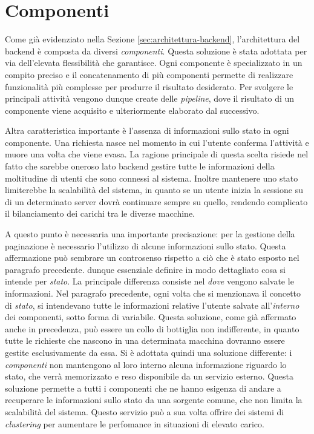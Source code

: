 \section{Componenti\label{sec:componenti-backend}}

Come già evidenziato nella Sezione \ref{sec:architettura-backend}, l'architettura del backend è composta da diversi \emph{componenti}. Questa soluzione è stata adottata per via dell'elevata flessibilità che garantisce. Ogni componente è specializzato in un compito preciso e il concatenamento di più componenti permette di realizzare funzionalità più complesse per produrre il risultato desiderato. Per svolgere le principali attività vengono dunque create delle \emph{pipeline}, dove il risultato di un componente viene acquisito e ulteriormente elaborato dal successivo.

Altra caratteristica importante è l'assenza di informazioni sullo stato in ogni componente. Una richiesta nasce nel momento in cui l'utente conferma l'attività e muore una volta che viene evasa. La ragione principale di questa scelta risiede nel fatto che sarebbe oneroso lato backend gestire tutte le informazioni della moltitudine di utenti che sono connessi al sistema. Inoltre mantenere uno stato limiterebbe la scalabilità del sistema, in quanto se un utente inizia la sessione su di un determinato server dovrà continuare sempre su quello, rendendo complicato il bilanciamento dei carichi tra le diverse macchine.

A questo punto è necessaria una importante precisazione: per la gestione della paginazione è necessario l'utilizzo di alcune informazioni sullo stato. Questa affermazione può sembrare un controsenso rispetto a ciò che è stato esposto nel paragrafo precedente. \upe dunque essenziale definire in modo dettagliato cosa si intende per \emph{stato}. La principale differenza consiste nel \emph{dove} vengono salvate le informazioni. Nel paragrafo precedente, ogni volta che si menzionava il concetto di \emph{stato}, si intendevano tutte le informazioni relative l'utente salvate all'\emph{interno} dei componenti, sotto forma di variabile. Questa soluzione, come già affermato anche in precedenza, può essere un collo di bottiglia non indifferente, in quanto tutte le richieste che nascono in una determinata macchina dovranno essere gestite esclusivamente da essa. Si è adottata quindi una soluzione differente: i \emph{componenti} non mantengono al loro interno alcuna informazione riguardo lo stato, che verrà memorizzato e reso disponibile da un servizio esterno. Questa soluzione permette a tutti i componenti che ne hanno esigenza di andare a recuperare le informazioni sullo stato da una sorgente comune, che non limita la scalabilità del sistema. Questo servizio può a sua volta offrire dei sistemi di \emph{clustering} per aumentare le perfomance in situazioni di elevato carico.


